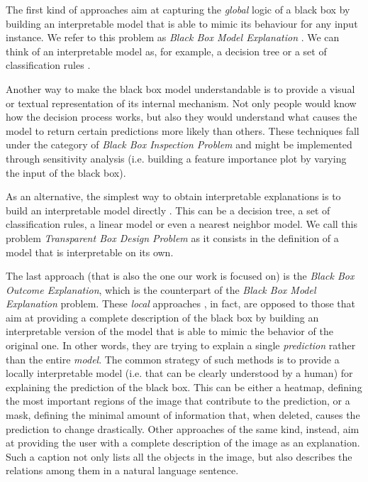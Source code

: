 \documentclass[12pt, twoside, a4paper]{report}
\begin{document}
The first kind of approaches aim at capturing the \textit{global} logic of a black box by building an interpretable model that is able to mimic its behaviour for any input instance. We refer to this problem as \textit{Black Box Model Explanation} \cite{survey}. We can think of an interpretable model as, for example, a decision tree \cite{global1, global2, global3} or a set of classification rules \cite{huysmans}. 

Another way to make the black box model understandable is to provide a visual or textual representation of its internal mechanism. Not only people would know how the decision process works, but also they would understand what causes the model to return certain predictions more likely than others. These techniques fall under the category of \textit{Black Box Inspection Problem} and might be implemented through sensitivity analysis \cite{inspection1, inspection2} (i.e. building a feature importance plot by varying the input of the black box). 

As an alternative, the simplest way to obtain interpretable explanations is to build an interpretable model directly \cite{transparent1, transparent2, transparent3}. This can be a decision tree, a set of classification rules, a linear model or even a nearest neighbor model. We call this problem \textit{Transparent Box Design Problem} as it consists in the definition of a model that is interpretable on its own.

The last approach (that is also the one our work is focused on) is the \textit{Black Box Outcome Explanation}, which is the counterpart of the \textit{Black Box Model Explanation} problem. 
These \textit{local} approaches \cite{survey}, in fact, are opposed to those that aim at providing a complete description of the black box by building an interpretable version of the model that is able to mimic the behavior of the original one. In other words, they are trying to explain a single \textit{prediction} rather than the entire \textit{model}.
The common strategy of such methods is to provide a locally interpretable model (i.e. that can be clearly understood by a human) for explaining the prediction of the black box. This can be either a heatmap, defining the most important regions of the image that contribute to the prediction, or a mask, defining the minimal amount of information that, when deleted, causes the prediction to change drastically.
Other approaches of the same kind, instead, aim at providing the user with a complete description of the image as an explanation. Such a caption not only lists all the objects in the image, but also describes the relations among them in a natural language sentence.
\end{document}
